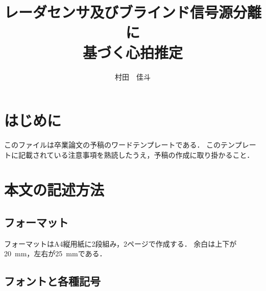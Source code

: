\documentclass[a4j]{jsarticle}
\title{レーダセンサ及びブラインド信号源分離に\\基づく心拍推定}
\author{村田　佳斗}
\begin{document}
\maketitle%



\thispagestyle{empty}
\pagestyle{empty}

\section{はじめに}

このファイルは卒業論文の予稿のワードテンプレートである．
このテンプレートに記載されている注意事項を熟読したうえ，予稿の作成に取り掛かること．

\section{本文の記述方法}

\subsection{フォーマット}

フォーマットはA4縦用紙に2段組み，2ページで作成する．
余白は上下が20~mm，左右が25~mmである．

\subsection{フォントと各種記号}
\end{document}
